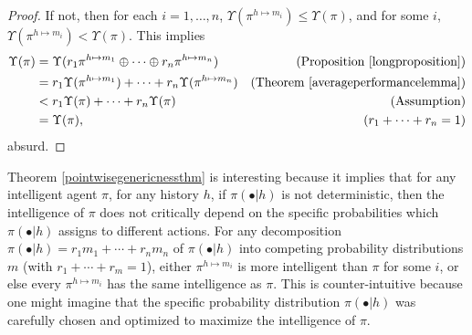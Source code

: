 \documentclass[runningheads]{llncs}
\begin{document}
\begin{proof}
    If not, then for each $i=1,\ldots,n$, $\Upsilon(\pi^{h\mapsto m_i})\leq\Upsilon(\pi)$,
    and for some $i$, $\Upsilon(\pi^{h\mapsto m_i})<\Upsilon(\pi)$.
    This implies
    \begin{align*}
        \Upsilon(\pi)
            &= \Upsilon(r_1\pi^{h\mapsto m_1}\oplus\cdots\oplus r_n\pi^{h\mapsto m_n})
                &\mbox{(Proposition \ref{longproposition})}\\
            &= r_1\Upsilon(\pi^{h\mapsto m_1})+\cdots+r_n\Upsilon(\pi^{h\mapsto m_n})
                &\mbox{(Theorem \ref{averageperformancelemma})}\\
            &< r_1\Upsilon(\pi)+\cdots+r_n\Upsilon(\pi)
                &\mbox{(Assumption)}\\
            &= \Upsilon(\pi),
                &\mbox{($r_1+\cdots+r_n=1$)}
    \end{align*}
    absurd.
\end{proof}

Theorem \ref{pointwisegenericnessthm} is interesting because it implies that for
any intelligent agent $\pi$, for any history $h$, if $\pi(\bullet|h)$ is not deterministic,
then the intelligence of $\pi$ does not critically depend on the specific probabilities
which $\pi(\bullet|h)$ assigns to different actions. For any decomposition
$\pi(\bullet|h)=r_1m_1+\cdots+r_nm_n$ of $\pi(\bullet|h)$ into competing probability
distributions $m$ (with $r_1+\cdots+r_m=1$), either $\pi^{h\mapsto m_i}$ is more intelligent
than $\pi$ for some $i$, or else every $\pi^{h\mapsto m_i}$ has the same intelligence as
$\pi$. This is counter-intuitive because one might imagine that the specific probability
distribution $\pi(\bullet|h)$ was carefully chosen and optimized to maximize the intelligence
of $\pi$.
\end{document}
